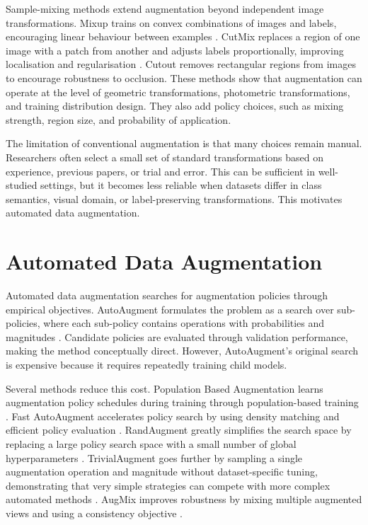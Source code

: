 \documentclass[12pt,a4paper]{report}
\begin{document}
Sample-mixing methods extend augmentation beyond independent image transformations. Mixup trains on convex combinations of images and labels, encouraging linear behaviour between examples \citep{zhang2018mixup}. CutMix replaces a region of one image with a patch from another and adjusts labels proportionally, improving localisation and regularisation \citep{yun2019cutmix}. Cutout \citep{devries2017cutout} removes rectangular regions from images to encourage robustness to occlusion. These methods show that augmentation can operate at the level of geometric transformations, photometric transformations, and training distribution design. They also add policy choices, such as mixing strength, region size, and probability of application.

The limitation of conventional augmentation is that many choices remain manual. Researchers often select a small set of standard transformations based on experience, previous papers, or trial and error. This can be sufficient in well-studied settings, but it becomes less reliable when datasets differ in class semantics, visual domain, or label-preserving transformations. This motivates automated data augmentation.

\section{Automated Data Augmentation}

Automated data augmentation searches for augmentation policies through empirical objectives. AutoAugment formulates the problem as a search over sub-policies, where each sub-policy contains operations with probabilities and magnitudes \citep{cubuk2019autoaugment}. Candidate policies are evaluated through validation performance, making the method conceptually direct. However, AutoAugment's original search is expensive because it requires repeatedly training child models.

Several methods reduce this cost. Population Based Augmentation learns augmentation policy schedules during training through population-based training \citep{ho2019population}. Fast AutoAugment accelerates policy search by using density matching and efficient policy evaluation \citep{lim2019fast}. RandAugment greatly simplifies the search space by replacing a large policy search space with a small number of global hyperparameters \citep{cubuk2020randaugment}. TrivialAugment goes further by sampling a single augmentation operation and magnitude without dataset-specific tuning, demonstrating that very simple strategies can compete with more complex automated methods \citep{muller2021trivialaugment}. AugMix improves robustness by mixing multiple augmented views and using a consistency objective \citep{hendrycks2020augmix}.
\end{document}
